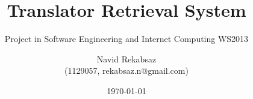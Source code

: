 \title{Translator Retrieval System}
\subtitle{Project in Software Engineering and Internet Computing WS2013 \\[0.8cm] {\rmfamily\normalfont\Large}}

\author{
    Navid Rekabsaz \\ {\small (1129057, rekabsaz.n@gmail.com)}
}

\date{\today}
